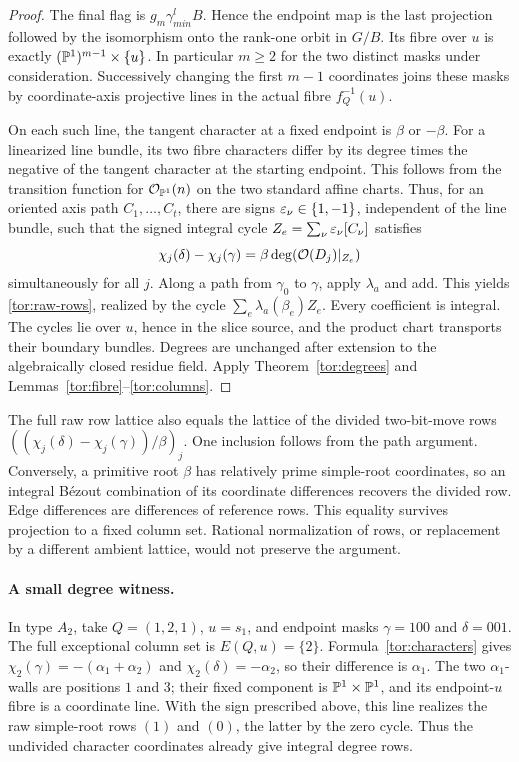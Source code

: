 \begin{proof}
The final flag is $g_m\gamma_{min}^lB$. Hence the endpoint map is the last projection followed by the isomorphism onto the rank-one orbit in $G/B$. Its fibre over $u$ is exactly $(\mathbb P^1)^{m-1}\times\{u\}$. In particular $m\ge2$ for the two distinct masks under consideration. Successively changing the first $m-1$ coordinates joins these masks by coordinate-axis projective lines in the actual fibre $f_Q^{-1}(u)$.

On each such line, the tangent character at a fixed endpoint is $\beta$ or $-\beta$. For a linearized line bundle, its two fibre characters differ by its degree times the negative of the tangent character at the starting endpoint. This follows from the transition function for $\mathcal O_{\mathbb P^1}(n)$ on the two standard affine charts. Thus, for an oriented axis path $C_1,\ldots,C_t$, there are signs $\varepsilon_\nu\in\{1,-1\}$, independent of the line bundle, such that the signed integral cycle $Z_e=\sum_\nu\varepsilon_\nu[C_\nu]$ satisfies
\[
 \chi_j(\delta)-\chi_j(\gamma)
 =\beta\deg(\mathcal O(D_j)|_{Z_e})
\]
simultaneously for all $j$. Along a path from $\gamma_0$ to $\gamma$, apply $\lambda_a$ and add. This yields \eqref{tor:raw-rows}, realized by the cycle $\sum_e\lambda_a(\beta_e)Z_e$. Every coefficient is integral. The cycles lie over $u$, hence in the slice source, and the product chart transports their boundary bundles. Degrees are unchanged after extension to the algebraically closed residue field. Apply Theorem~\ref{tor:degrees} and Lemmas~\ref{tor:fibre}--\ref{tor:columns}.
\end{proof}

The full raw row lattice also equals the lattice of the divided two-bit-move rows $((\chi_j(\delta)-\chi_j(\gamma))/\beta)_j$. One inclusion follows from the path argument. Conversely, a primitive root $\beta$ has relatively prime simple-root coordinates, so an integral B\'ezout combination of its coordinate differences recovers the divided row. Edge differences are differences of reference rows. This equality survives projection to a fixed column set. Rational normalization of rows, or replacement by a different ambient lattice, would not preserve the argument.

\paragraph{A small degree witness.}
In type $A_2$, take $Q=(1,2,1)$, $u=s_1$, and endpoint masks $\gamma=100$ and $\delta=001$. The full exceptional column set is $E(Q,u)=\{2\}$. Formula~\eqref{tor:characters} gives $\chi_2(\gamma)=-(\alpha_1+\alpha_2)$ and $\chi_2(\delta)=-\alpha_2$, so their difference is $\alpha_1$. The two $\alpha_1$-walls are positions $1$ and $3$; their fixed component is $\mathbb P^1\times\mathbb P^1$, and its endpoint-$u$ fibre is a coordinate line. With the sign prescribed above, this line realizes the raw simple-root rows $(1)$ and $(0)$, the latter by the zero cycle. Thus the undivided character coordinates already give integral degree rows.

